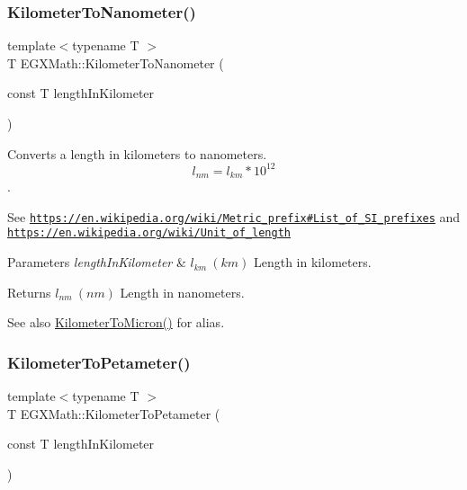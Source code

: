 \subsubsection{\texorpdfstring{Kilometer\+To\+Nanometer()}{KilometerToNanometer()}}
{\footnotesize\ttfamily template$<$typename T $>$ \\
T E\+G\+X\+Math\+::\+Kilometer\+To\+Nanometer (\begin{DoxyParamCaption}\item[{const T}]{length\+In\+Kilometer }\end{DoxyParamCaption})}



Converts a length in kilometers to nanometers. \[ l_{nm}=l_{km} * 10^{12} \]. 

See \href{https://en.wikipedia.org/wiki/Metric_prefix#List_of_SI_prefixes}{\tt https\+://en.\+wikipedia.\+org/wiki/\+Metric\+\_\+prefix\#\+List\+\_\+of\+\_\+\+S\+I\+\_\+prefixes} and \href{https://en.wikipedia.org/wiki/Unit_of_length}{\tt https\+://en.\+wikipedia.\+org/wiki/\+Unit\+\_\+of\+\_\+length} 
\begin{DoxyParams}{Parameters}
{\em length\+In\+Kilometer} & $ l_{km}\ (km)$ Length in kilometers. \\
\hline
\end{DoxyParams}
\begin{DoxyReturn}{Returns}
$ l_{nm}\ (nm)$ Length in nanometers. 
\end{DoxyReturn}
\begin{DoxySeeAlso}{See also}
\mbox{\hyperlink{group___e_g_x_math-_conversions-_length_conversions-_kilometer-_non-_s_i_gae662bafe0d1fc36276a336fd969307a0}{Kilometer\+To\+Micron()}} for alias. 
\end{DoxySeeAlso}
\mbox{\label{group___e_g_x_math-_conversions-_length_conversions-_kilometer-_s_i_ga79a0e22448e08eeb755577316635058a}} 
\subsubsection{\texorpdfstring{Kilometer\+To\+Petameter()}{KilometerToPetameter()}}
{\footnotesize\ttfamily template$<$typename T $>$ \\
T E\+G\+X\+Math\+::\+Kilometer\+To\+Petameter (\begin{DoxyParamCaption}\item[{const T}]{length\+In\+Kilometer }\end{DoxyParamCaption})}



